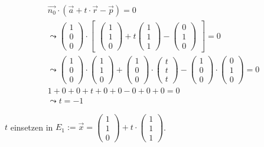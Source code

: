 \begin{gather}
\vec{n_0} \cdot (\vec{a}+t\cdot \vec{r}-\vec{p})=0\\
\leadsto 
\begin{pmatrix}
1\\0\\0
\end{pmatrix} \cdot 
\begin{bmatrix}
\begin{pmatrix}
1\\1\\0
\end{pmatrix}
+ t
\begin{pmatrix}
1\\1\\1
\end{pmatrix}
-
\begin{pmatrix}
0\\1\\0
\end{pmatrix}
\end{bmatrix} = 0\\
\leadsto
\begin{pmatrix}
1\\0\\0
\end{pmatrix}\cdot
\begin{pmatrix}
1\\1\\0
\end{pmatrix}
+
\begin{pmatrix}
1\\0\\0
\end{pmatrix}
\cdot
\begin{pmatrix}
t\\t\\t
\end{pmatrix}
-
\begin{pmatrix}
1\\0\\0
\end{pmatrix}
\cdot
\begin{pmatrix}
0\\1\\0
\end{pmatrix} =0\\
1+0+0+t+0+0-0+0+0=0\\
\leadsto t=-1
\end{gather}

\ensuremath{t} einsetzen in \ensuremath{E_1:= \vec{x}=\begin{pmatrix}
		1\\1\\0
	\end{pmatrix} +t\cdot\begin{pmatrix}
		1\\1\\1
\end{pmatrix}}.\\

